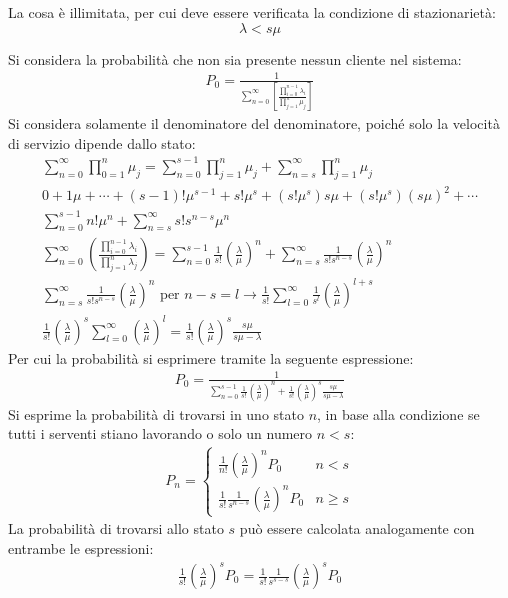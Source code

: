 \documentclass{article}
\numberwithin{equation}{subsection}
\begin{document}
La cosa è illimitata, per cui deve essere verificata la condizione di stazionarietà: 
\begin{equation*}
    \lambda<s\mu
\end{equation*}

Si considera la probabilità che non sia presente nessun cliente nel sistema:
\begin{gather*}
    P_0=\displaystyle\frac{1}{\displaystyle\sum_{n=0}^{\infty}\left[\frac{\displaystyle\prod_{i=0}^{n-1}\lambda_i}{\displaystyle\prod_{j=1}^n\mu_j}\right]}
\end{gather*}
Si considera solamente il denominatore del denominatore, poiché solo la velocità di servizio dipende dallo stato:
\begin{gather*}
    \displaystyle\sum_{n=0}^{\infty}\prod_{0=1}^n\mu_j=\sum_{n=0}^{s-1}\prod_{j=1}^n\mu_j+\sum_{n=s}^{\infty}\prod_{j=1}^n\mu_j\\
    0+1\mu+\cdots+(s-1)!\mu^{s-1}+s!\mu^s+(s!\mu^s)s\mu+(s!\mu^s)(s\mu)^2+\cdots\\
    \displaystyle\sum_{n=0}^{s-1}n!\mu^n+\sum_{n=s}^{\infty}s!s^{n-s}\mu^n\\
    \displaystyle\sum_{n=0}^{\infty}\left(\frac{\displaystyle\prod_{i=0}^{n-1}\lambda_i}{\displaystyle\prod_{j=1}^n\lambda_j}\right)=\sum_{n=0}^{s-1}\frac{1}{s!}\left(\frac{\lambda}{\mu}\right)^n+\sum_{n=s}^{\infty}\frac{1}{s!s^{n-s}}\left(\frac{\lambda}{\mu}\right)^n\\
    \displaystyle\sum_{n=s}^{\infty}\frac{1}{s!s^{n-s}}\left(\frac{\lambda}{\mu}\right)^n\mbox{ per }n-s=l\to\frac{1}{s!}\sum_{l=0}^{\infty}\frac{1}{s^l}\left(\frac{\lambda}{\mu}\right)^{l+s}\\
    \frac{1}{s!}\left(\frac{\lambda}{\mu}\right)^s\sum_{l=0}^{\infty}\left(\frac{\lambda}{\mu}\right)^l=\frac{1}{s!}\left(\frac{\lambda}{\mu}\right)^s\frac{s\mu}{s\mu-\lambda}
\end{gather*}
Per cui la probabilità si esprimere tramite la seguente espressione:
\begin{gather}
    P_0=\displaystyle\frac{1}{\displaystyle\sum_{n=0}^{s-1}\frac{1}{s!}\left(\frac{\lambda}{\mu}\right)^n+\frac{1}{s!}\left(\frac{\lambda}{\mu}\right)^s\frac{s\mu}{s\mu-\lambda}}
\end{gather}
Si esprime la probabilità di trovarsi in uno stato $n$, in base alla condizione se tutti i serventi stiano lavorando o solo un numero $n<s$:
\begin{gather*}
   P_n=\begin{cases}
    \displaystyle\frac{1}{n!}\left(\frac{\lambda}{\mu}\right)^nP_0&n<s\\
    \displaystyle\frac{1}{s!}\frac{1}{s^{n-s}}\left(\frac{\lambda}{\mu}\right)^nP_0&n\geq s
   \end{cases} 
\end{gather*}
La probabilità di trovarsi allo stato $s$ può essere calcolata analogamente con entrambe le espressioni:
\begin{gather*}
    \displaystyle\frac{1}{s!}\left(\frac{\lambda}{\mu}\right)^sP_0=\frac{1}{s!}\frac{1}{s^{s-s}}\left(\frac{\lambda}{\mu}\right)^sP_0
\end{gather*}
\end{document}
